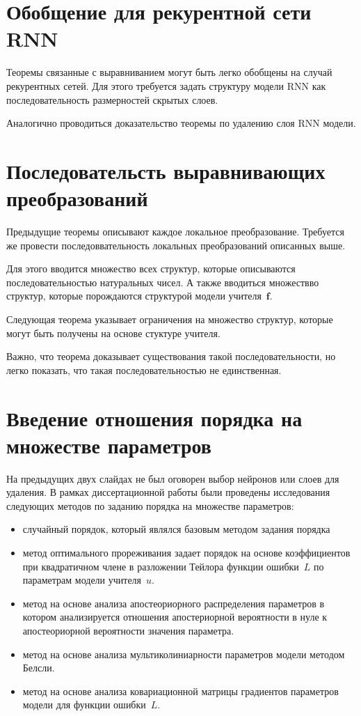 \documentclass[10pt, twoside]{article}
\begin{document}
\section{Обобщение для рекурентной сети RNN}

Теоремы связанные с выравниванием могут быть легко обобщены на случай рекурентных сетей. Для этого требуется задать структуру модели RNN как последовательность размерностей скрытых слоев.

Аналогично проводиться доказательство теоремы по удалению слоя RNN модели.

\section{Последовательсть выравнивающих преобразований}

Предыдущие теоремы описывают каждое локальное преобразование. Требуется же провести последоввательность локальных преобразований описанных выше.

Для этого вводится множество всех структур, которые описываются последовательностью натуральных чисел. А также вводиться множествво структур, которые порождаются структурой модели учителя~$\mathbf{f}$.

Следующая теорема указывает ограничения на множество структур, которые могут быть получены на основе стуктуре учителя.

Важно, что теорема доказывает существования такой последовательности, но легко показать, что такая последовательностью не единственная.

\section{Введение отношения порядка на множестве параметров}
На предыдущих двух слайдах не был оговорен выбор нейронов или слоев для удаления. В рамках диссертационной работы были проведены исследования следующих методов по заданию порядка на множестве параметров:
\begin{itemize}
    \item случайный порядок, который являлся базовым методом задания порядка
    \item метод оптимального прореживания задает порядок на основе коэффициентов при квадратичном члене в разложении Тейлора функции ошибки~$L$ по параметрам модели учителя~$u$.
    \item метод на основе анализа апостеориорного распределения параметров в котором анализируется отношения апостериорной вероятности в нуле к апостеориорной вероятности значения параметра.
    \item метод на основе анализа мультиколиниарности параметров модели методом Белсли.
    \item метод на основе анализа ковариационной матрицы градиентов параметров модели для функции ошибки~$L$.
\end{itemize}
\end{document}
